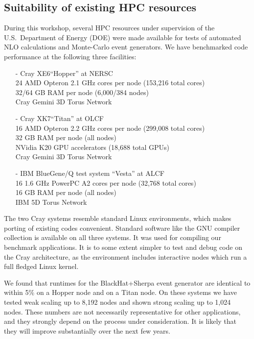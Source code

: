\documentclass[12pt]{article}
\newcommand{\registered}{\textsuperscript{\textregistered}\xspace}
\newcommand{\trademark}{\textsuperscript{\texttrademark}\xspace}
\begin{document}
\subsection{Suitability of existing HPC resources}
During this workshop, several HPC resources under supervision of the
U.S.\ Department of Energy (DOE) were made available for tests of
automated NLO calculations and Monte-Carlo event generators.  We have
benchmarked code performance at the following three facilities:
\begin{itemize}
\item[-] Cray XE6\trademark ``Hopper'' at NERSC~\cite{NERSC}\\
  24 AMD Opteron\trademark 2.1 GHz cores per node (153,216 total cores)\\
  32/64 GB RAM per node (6,000/384 nodes)\\
  Cray Gemini 3D Torus Network
\item[-] Cray XK7\trademark ``Titan'' at OLCF~\cite{OLCF}\\
  16 AMD Opteron\trademark 2.2 GHz cores per node (299,008 total cores)\\
  32 GB RAM per node (all nodes)\\
  NVidia\registered K20 GPU accelerators (18,688 total GPUs)\\
  Cray Gemini 3D Torus Network
\item[-] IBM\registered BlueGene\registered/Q test system ``Vesta'' at ALCF~\cite{ALCF}\\
  16 1.6 GHz PowerPC\registered A2 cores per node (32,768 total cores)\\
  16 GB RAM per node (all nodes)\\
  IBM 5D Torus Network
\end{itemize}

The two Cray systems resemble standard Linux environments,
which makes porting of existing codes convenient. Standard software
like the GNU compiler collection is available on all three systems. 
It was used for compiling our benchmark applications. It is to some 
extent simpler to test and debug code on the Cray architecture, 
as the environment includes interactive nodes which run a full fledged
Linux kernel.

We found that runtimes for the BlackHat+Sherpa event generator are identical 
to within 5\% on a Hopper node and on a Titan node. On these systems we have 
tested weak scaling up to 8,192 nodes and shown strong scaling up to 1,024 nodes.
These numbers are not necessarily representative for other applications, 
and they strongly depend on the process under consideration. 
It is likely that they will improve substantially over the next few years.
\end{document}
